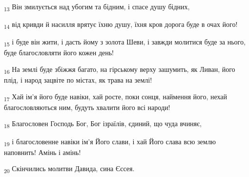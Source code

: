 \begin{tcolorbox}
\textsubscript{13} Він змилується над убогим та бідним, і спасе душу бідних,
\end{tcolorbox}
\begin{tcolorbox}
\textsubscript{14} від кривди й насилля врятує їхню душу, їхня кров дорога буде в очах його!
\end{tcolorbox}
\begin{tcolorbox}
\textsubscript{15} і буде він жити, і дасть йому з золота Шеви, і завжди молитися буде за нього, буде благословляти його кожен день!
\end{tcolorbox}
\begin{tcolorbox}
\textsubscript{16} На землі буде збіжжя багато, на гірському верху зашумить, як Ливан, його плід, і народ зацвіте по містах, як трава на землі!
\end{tcolorbox}
\begin{tcolorbox}
\textsubscript{17} Хай ім'я його буде навіки, хай росте, поки сонця, наймення його, нехай благословляються ним, будуть хвалити його всі народи!
\end{tcolorbox}
\begin{tcolorbox}
\textsubscript{18} Благословен Господь Бог, Бог ізраїлів, єдиний, що чуда вчиняє,
\end{tcolorbox}
\begin{tcolorbox}
\textsubscript{19} і благословенне навіки ім'я Його слави, і хай Його слава всю землю наповнить! Амінь і амінь!
\end{tcolorbox}
\begin{tcolorbox}
\textsubscript{20} Скінчились молитви Давида, сина Єссея.
\end{tcolorbox}
